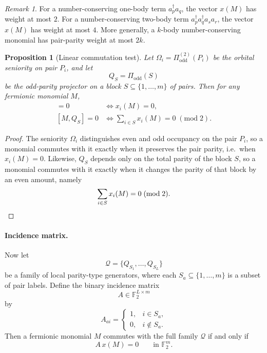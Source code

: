 \documentclass[11pt]{article}
\newcommand{\F}{\mathbb{F}_2}
\newcommand{\odd}{\mathrm{odd}}
\newcommand{\modtwo}{\; (\mathrm{mod}\; 2)}
\newtheorem{proposition}[theorem]{Proposition}
\theoremstyle{definition}
\theoremstyle{remark}
\newtheorem{remark}[theorem]{Remark}
\begin{document}
\begin{remark}
For a number-conserving one-body term $a_p^\dagger a_q$, the vector $x(M)$ has weight at most $2$.
For a number-conserving two-body term $a_p^\dagger a_q^\dagger a_s a_r$, the vector $x(M)$ has weight at most $4$.
More generally, a $k$-body number-conserving monomial has pair-parity weight at most $2k$.
\end{remark}

\begin{proposition}[Linear commutation test]
Let $\Omega_i=\Pi^{(2)}_{\odd}(P_i)$ be the orbital seniority on pair $P_i$, and let
\begin{equation}
  Q_S=\Pi_{\odd}(S)
\end{equation}
be the odd-parity projector on a block $S\subseteq \{1,\dots,m\}$ of pairs. Then for any fermionic monomial $M$,
\begin{align}
  [M,\Omega_i]=0
  &\iff
  x_i(M)=0,
  \\
  [M,Q_S]=0
  &\iff
  \sum_{i\in S} x_i(M)=0 \modtwo.
\end{align}
\end{proposition}

\begin{proof}
The seniority $\Omega_i$ distinguishes even and odd occupancy on the pair $P_i$, so a monomial commutes with it
exactly when it preserves the pair parity, i.e.\ when $x_i(M)=0$.
Likewise, $Q_S$ depends only on the total parity of the block $S$, so a monomial commutes with it exactly when it changes the parity of that block by an even amount, namely
\[
\sum_{i\in S}x_i(M)=0 \modtwo .
\qedhere
\]
\end{proof}

\paragraph{Incidence matrix.}
Now let
\begin{equation}
  \mathcal Q=\{Q_{S_1},\dots,Q_{S_L}\}
\end{equation}
be a family of local parity-type generators, where each $S_a\subseteq \{1,\dots,m\}$ is a subset of pair labels.
Define the binary incidence matrix
\begin{equation}
  A\in \F^{L\times m}
\end{equation}
by
\begin{equation}
  A_{ai}
  =
  \begin{cases}
    1, & i\in S_a,\\
    0, & i\notin S_a.
  \end{cases}
\end{equation}
Then a fermionic monomial $M$ commutes with the full family $\mathcal Q$ if and only if
\begin{equation}
  A\,x(M)=0
  \qquad \text{in } \F^m .
\end{equation}
\end{document}

